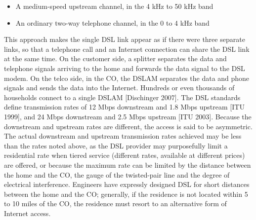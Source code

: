 \documentclass{article}
\begin{document}
\begin{description}
\begin{itemize}
        \item A medium-speed upstream channel, in the 4 kHz to 50 kHz band
        \item An ordinary two-way telephone channel, in the 0 to 4 kHz band
    \end{itemize}
    This approach makes the single DSL link appear as if there were three separate
    links, so that a telephone call and an Internet connection can share the DSL link at
    the same time. On the customer side, a splitter separates the data and telephone signals
    arriving to the home and forwards the data signal to the DSL modem. On the
    telco side, in the CO, the DSLAM separates the data and phone signals and sends
    the data into the Internet. Hundreds or even thousands of households connect to a
    single DSLAM [Dischinger 2007]. The DSL standards define transmission rates of 12 Mbps downstream and
    1.8 Mbps upstream [ITU 1999], and 24 Mbps downstream and 2.5 Mbps upstream
    [ITU 2003]. Because the downstream and upstream rates are different, the access is
    said to be asymmetric. The actual downstream and upstream transmission rates
    achieved may be less than the rates noted above, as the DSL provider may purposefully
    limit a residential rate when tiered service (different rates, available at different
    prices) are offered, or because the maximum rate can be limited by the distance
    between the home and the CO, the gauge of the twisted-pair line and the degree of
    electrical interference. Engineers have expressly designed DSL for short distances
    between the home and the CO; generally, if the residence is not located within 5 to 10
    miles of the CO, the residence must resort to an alternative form of Internet access.


\end{description}
\end{document}

